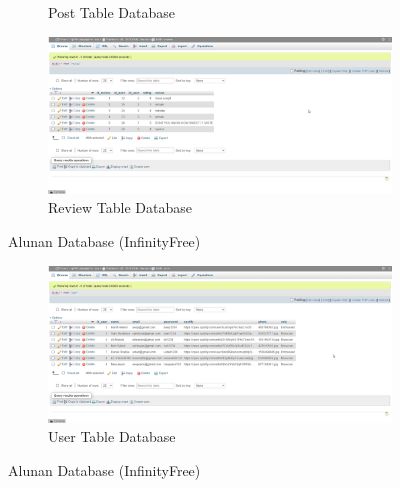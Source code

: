 \begin{enumerate}[1.]
\begin{figure}[h]
\begin{subfigure}[b]{1.0\textwidth}
            \caption{Post Table Database}
            \vspace{0.8cm}
            \label{fig:sub3}
        \end{subfigure}
        \hspace{0.08\textwidth}
        \begin{subfigure}[b]{1.0\textwidth}
            \centering
            \includegraphics[width=\textwidth]{mainmatter/images/backend/ifreview.png}
            \caption{Review Table Database}
            \label{fig:sub4}
        \end{subfigure}
        \caption{Alunan Database (InfinityFree)}
        \label{fig:myfig72b}
    \end{figure}
    \clearpage
    \begin{figure}[h]
        \centering
        \begin{subfigure}[b]{1.0\textwidth}
            \centering
            \includegraphics[width=\textwidth]{mainmatter/images/backend/ifuser.png}
            \caption{User Table Database}
            \label{fig:sub5}
        \end{subfigure}
        \caption{Alunan Database (InfinityFree)}
        \label{fig:myfig72c}
    \end{figure}


\end{enumerate}

